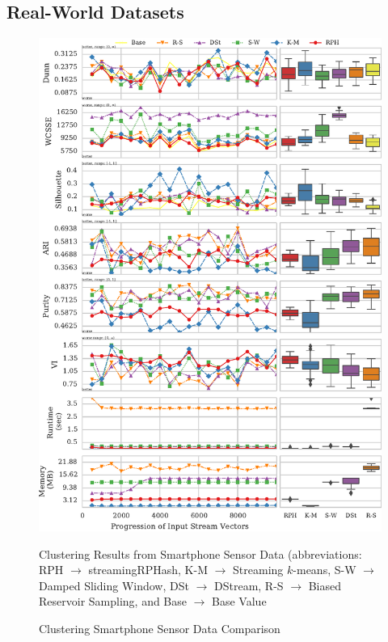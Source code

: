 \subsection{Real-World Datasets}

\begin{figure}
  \centerline{\includegraphics[width=.9\textwidth]{figs/har_all_measures}}
  \caption{Clustering Smartphone Sensor Data Comparison}{Clustering Results from Smartphone Sensor Data (abbreviations:
    RPH $\rightarrow$ \textsf{streamingRPHash},
    K-M $\rightarrow$ Streaming $k$-means,
    S-W $\rightarrow$ Damped Sliding Window,
    DSt $\rightarrow$ DStream,
    R-S $\rightarrow$ Biased Reservoir Sampling, and
    Base $\rightarrow$ Base Value}\label{human-measures}
\end{figure}

